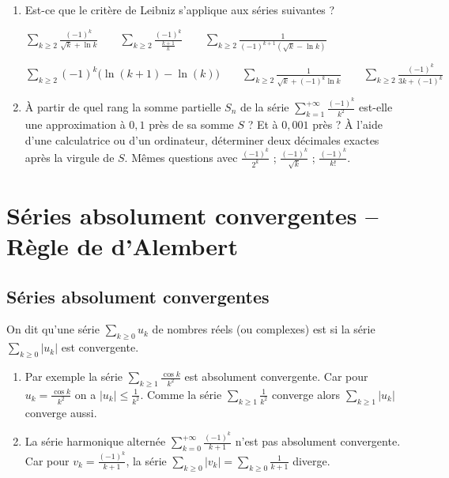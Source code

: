 \documentclass[class=report,crop=false]{standalone}
\begin{document}
\begin{miniexercices}
\begin{enumerate}
  \item Est-ce que le critère de Leibniz s'applique aux séries suivantes ?
  
  \centerline{$\displaystyle
  \sum_{k\ge 2} \frac{(-1)^k}{\sqrt k + \ln k} \qquad
  \sum_{k\ge 2} \frac{(-1)^k}{\frac{k+1}{k}} \qquad
  \sum_{k\ge2} \frac{1}{(-1)^{k+1}(\sqrt k - \ln k)}
  $}
  
  \centerline{$\displaystyle
  \sum_{k\ge 2} (-1)^k\big(\ln(k+1)-\ln(k)\big) \qquad
  \sum_{k\ge2} \frac{1}{\sqrt k + (-1)^{k}\ln k} \qquad
  \sum_{k\ge 2} \frac{(-1)^k}{3k + (-1)^k}$}
  

  \item \`A partir de quel rang la somme partielle
  $S_n$ de la série $\sum_{k=1}^{+\infty} \frac{(-1)^k}{k^2}$ 
  est-elle une approximation à $0,1$ près de sa somme $S$ ?
  Et à $0,001$ près ?
  \`A l'aide d'une calculatrice ou d'un ordinateur, déterminer deux décimales
  exactes après la virgule de $S$.
  Mêmes questions avec  $\frac{(-1)^k}{2^k}$ ; $\frac{(-1)^k}{\sqrt{k}}$ ;
  $\frac{(-1)^k}{k!}$.
  
\end{enumerate}
\end{miniexercices}



\section{Séries absolument convergentes -- Règle de d'Alembert}

\subsection{Séries absolument convergentes}


\begin{definition}
On dit qu'une série $\sum_{k\ge0} u_k$ de nombres réels (ou complexes) est 
 si la série $\sum_{k\ge0} |u_k|$ 
est convergente.  
\end{definition}



\begin{exemple}
\begin{enumerate}
  \item Par exemple la série $\sum_{k\ge1} \frac{\cos k}{k^2}$ est absolument convergente.
  Car pour $u_k =  \frac{\cos k}{k^2}$ on a $|u_k| \le  \frac{1}{k^2}$. Comme la série
  $\sum_{k\ge1} \frac{1}{k^2}$ converge alors $\sum_{k\ge1} |u_k|$ converge aussi.
  
  \item La série harmonique alternée $\sum_{k=0}^{+\infty} \frac{(-1)^k}{k+1}$ 
  n'est pas absolument convergente. Car pour $v_k = \frac{(-1)^k}{k+1}$,
  la série $\sum_{k\ge0} |v_k| = \sum_{k\ge0} \frac{1}{k+1}$ diverge.
\end{enumerate}
\end{exemple}
\end{document}
